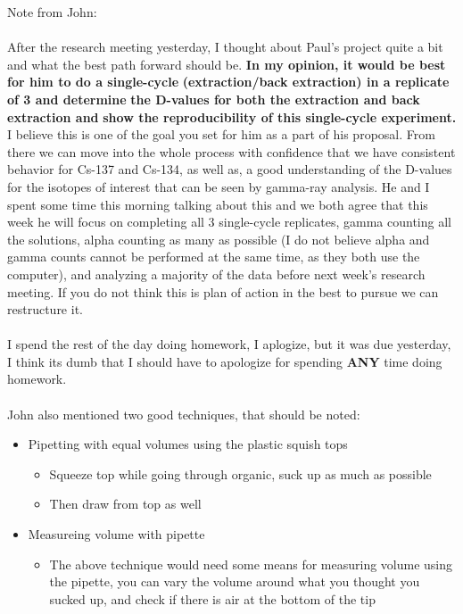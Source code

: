 \documentclass[idxtotoc,hyperref,openany,oneside]{labbook} %
\begin{document}



Note from John:\\~\\
After the research meeting yesterday, I thought about Paul’s
project quite a bit and what the best path forward should be.
\textbf{In my opinion, it would be best for him to do a single-cycle}
\textbf{(extraction/back extraction) in a replicate of 3 and determine}
\textbf{the D-values for both the extraction and back extraction and}
\textbf{show the reproducibility of this single-cycle experiment.} I
believe this is one of the goal you set for him as a part of
his proposal. From there we can move into the whole process
with confidence that we have consistent behavior for Cs-137
and Cs-134, as well as, a good understanding of the D-values
for the isotopes of interest that can be seen by gamma-ray
analysis. He and I spent some time this morning talking about
this and we both agree that this week he will focus on completing
all 3 single-cycle replicates, gamma counting all the solutions,
alpha counting as many as possible (I do not believe alpha and
gamma counts cannot be performed at the same time, as they both
use the computer), and analyzing a majority of the data before
next week’s research meeting. If you do not think this is plan
of action in the best to pursue we can restructure it.
\\~\\
I spend the rest of the day doing homework, I aplogize,
but it was due yesterday, I think its dumb that I should
have to apologize for spending \textbf{ANY} time doing homework.
\\~\\
John also mentioned two good techniques, that should be noted:
\begin{itemize}
\item{Pipetting with equal volumes using the plastic squish tops}
  \begin{itemize}
  \item{Squeeze top while going through organic, suck up as much as
    possible}
  \item{Then draw from top as well}
  \end{itemize}
\item{Measureing volume with pipette}
  \begin{itemize}
  \item{The above technique would need some means for measuring volume
    using the pipette, you can vary the volume around
    what you thought you sucked up, and check if there is air
    at the bottom of the tip}
  \end{itemize}
\end{itemize}
\end{document}
